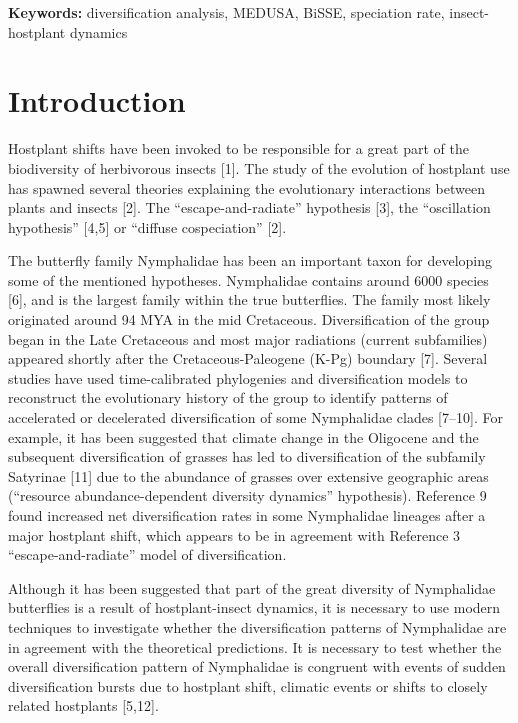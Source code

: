 \documentclass[10pt]{article}
\begin{document}
\textbf{Keywords:} diversification analysis, MEDUSA, BiSSE, speciation
rate, insect-hostplant dynamics

\section*{Introduction}

Hostplant shifts have been invoked to be responsible for a great part of
the biodiversity of herbivorous insects {[}1{]}. The study of the
evolution of hostplant use has spawned several theories explaining the
evolutionary interactions between plants and insects {[}2{]}. The
``escape-and-radiate'' hypothesis {[}3{]}, the ``oscillation
hypothesis'' {[}4,5{]} or ``diffuse cospeciation'' {[}2{]}.

The butterfly family Nymphalidae has been an important taxon for
developing some of the mentioned hypotheses. Nymphalidae contains around
6000 species {[}6{]}, and is the largest family within the true
butterflies. The family most likely originated around 94 MYA in the mid
Cretaceous. Diversification of the group began in the Late Cretaceous
and most major radiations (current subfamilies) appeared shortly after
the Cretaceous-Paleogene (K-Pg) boundary {[}7{]}. Several studies have
used time-calibrated phylogenies and diversification models to
reconstruct the evolutionary history of the group to identify patterns
of accelerated or decelerated diversification of some Nymphalidae clades
{[}7--10{]}. For example, it has been suggested that climate change in
the Oligocene and the subsequent diversification of grasses has led to
diversification of the subfamily Satyrinae {[}11{]} due to the abundance
of grasses over extensive geographic areas (``resource
abundance-dependent diversity dynamics'' hypothesis). Reference 9 found
increased net diversification rates in some Nymphalidae lineages after a
major hostplant shift, which appears to be in agreement with Reference 3
``escape-and-radiate'' model of diversification.

Although it has been suggested that part of the great diversity of
Nymphalidae butterflies is a result of hostplant-insect dynamics, it is
necessary to use modern techniques to investigate whether the
diversification patterns of Nymphalidae are in agreement with the
theoretical predictions. It is necessary to test whether the overall
diversification pattern of Nymphalidae is congruent with events of
sudden diversification bursts due to hostplant shift, climatic events or
shifts to closely related hostplants {[}5,12{]}.
\end{document}
